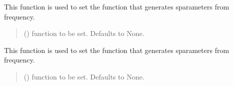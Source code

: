 \documentclass[letterpaper,10pt,english]{sphinxmanual}
\begin{document}
\begin{fulllineitems}
\begin{fulllineitems}
\end{fulllineitems}


\begin{fulllineitems}
\label{\detokenize{touchstone:touchstone.spfile.set_sparam_gen_func}}
\pysigstartsignatures
{}
\pysigstopsignatures
\sphinxAtStartPar
This function is used to set the function that generates s\sphinxhyphen{}parameters from frequency.
\begin{quote}\begin{description}
\sphinxAtStartPar
{} (\sphinxstyleliteralemphasis{\sphinxupquote{, }}) \textendash{} function to be set. Defaults to None.

\end{description}\end{quote}

\end{fulllineitems}


\begin{fulllineitems}
\label{\detokenize{touchstone:touchstone.spfile.set_sparam_mod_func}}
\pysigstartsignatures
{}
\pysigstopsignatures
\sphinxAtStartPar
This function is used to set the function that generates s\sphinxhyphen{}parameters from frequency.
\begin{quote}\begin{description}
\sphinxAtStartPar
{} (\sphinxstyleliteralemphasis{\sphinxupquote{, }}) \textendash{} function to be set. Defaults to None.

\end{description}\end{quote}


\end{fulllineitems}
\end{fulllineitems}
\end{document}
